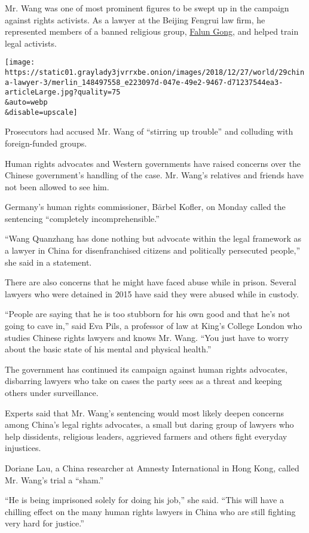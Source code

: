 Mr. Wang was one of most prominent figures to be swept up in the
campaign against rights activists. As a lawyer at the Beijing Fengrui
law firm, he represented members of a banned religious group,
\href{https://www.nytimes3xbfgragh.onion/topic/organization/falun-gong}{Falun
Gong}, and helped train legal activists.

\texttt{[image: https://static01.graylady3jvrrxbe.onion/images/2018/12/27/world/29china-lawyer-3/merlin\_148497558\_e223097d-047e-49e2-9467-d71237544ea3-articleLarge.jpg?quality=75\\\&auto=webp\\\&disable=upscale]}

Prosecutors had accused Mr. Wang of ``stirring up trouble'' and
colluding with foreign-funded groups.

Human rights advocates and Western governments have raised concerns over
the Chinese government's handling of the case. Mr. Wang's relatives and
friends have not been allowed to see him.

Germany's human rights commissioner, Bärbel Kofler, on Monday called the
sentencing ``completely incomprehensible.''

``Wang Quanzhang has done nothing but advocate within the legal
framework as a lawyer in China for disenfranchised citizens and
politically persecuted people,'' she said in a statement.

There are also concerns that he might have faced abuse while in prison.
Several lawyers who were detained in 2015 have said they were abused
while in custody.

``People are saying that he is too stubborn for his own good and that
he's not going to cave in,'' said Eva Pils, a professor of law at King's
College London who studies Chinese rights lawyers and knows Mr. Wang.
``You just have to worry about the basic state of his mental and
physical health.''

The government has continued its campaign against human rights
advocates, disbarring lawyers who take on cases the party sees as a
threat and keeping others under surveillance.

Experts said that Mr. Wang's sentencing would most likely deepen
concerns among China's legal rights advocates, a small but daring group
of lawyers who help dissidents, religious leaders, aggrieved farmers and
others fight everyday injustices.

Doriane Lau, a China researcher at Amnesty International in Hong Kong,
called Mr. Wang's trial a ``sham.''

``He is being imprisoned solely for doing his job,'' she said. ``This
will have a chilling effect on the many human rights lawyers in China
who are still fighting very hard for justice.''


